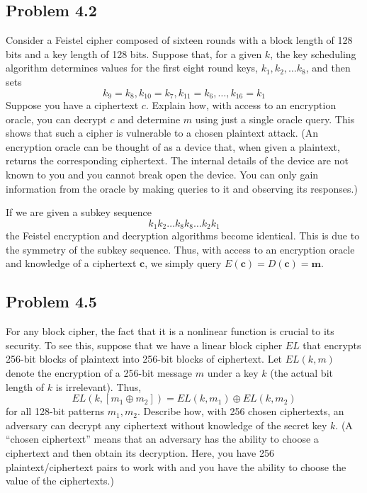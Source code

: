 \documentclass[../hw_sols.tex]{subfiles}
\begin{document}
	
\subsection*{Problem 4.2}

Consider a Feistel cipher composed of sixteen rounds with a block length of 
128 bits and a key length of 128 bits. Suppose that, for a given $k$, the key 
scheduling algorithm determines values for the first eight round keys, 
$k_1, k_2, \dots k_8$, and then sets
	\[ k_9 = k_8, k_{10} = k_7, k_{11} = k_6, \dots, k_{16} = k_1 \]
Suppose you have a ciphertext $c$. Explain how, with access to an encryption 
oracle, you can decrypt $c$ and determine $m$ using just a single oracle 
query. This shows that such a cipher is vulnerable to a chosen plaintext 
attack. (An encryption oracle can be thought of as a device that, when given 
a plaintext, returns the corresponding ciphertext. The internal details of 
the device are not known to you and you cannot break open the device. You 
can only gain information from the oracle by making queries to it and 
observing its responses.)

\begin{solution}
If we are given a subkey sequence 
	\[ k_1 k_2 \dots k_8 k_8 \dots k_2 k_1 \]
the Feistel encryption and decryption algorithms become identical. This is 
due to the symmetry of the subkey sequence. Thus, with access to an 
encryption oracle and knowledge of a ciphertext $\mathbf{c}$, we simply query 
$E(\mathbf{c}) = D(\mathbf{c}) = \mathbf{m}$.
\end{solution}


\newpage



\subsection*{Problem 4.5}

For any block cipher, the fact that it is a nonlinear function is crucial to 
its security. To see this, suppose that we have a linear block cipher $EL$ 
that encrypts 256-bit blocks of plaintext into 256-bit blocks of ciphertext. 
Let $EL(k, m)$ denote the encryption of a 256-bit message $m$ under a key $k$ 
(the actual bit length of $k$ is irrelevant). Thus,
	\[ EL(k,[m_1 \oplus m_2]) = EL(k,m_1) \oplus EL(k,m_2) \]
for all 128-bit patterns $m_1, m_2$. Describe how, with 256 chosen 
ciphertexts, an adversary can decrypt any ciphertext without knowledge of the 
secret key $k$. (A “chosen ciphertext” means that an adversary has the 
ability to choose a ciphertext and then obtain its decryption. Here, you have 
256 plaintext/ciphertext pairs to work with and you have the ability to 
choose the value of the ciphertexts.)
\end{document}
